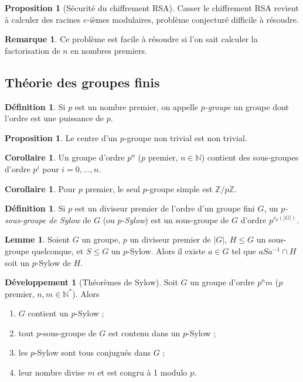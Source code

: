 \documentclass[a5paper, 10pt]{article}
\theoremstyle{definition}
\newtheorem{definition}[equation]{Définition}
\newtheorem{proposition}[equation]{Proposition}
\newtheorem{lemma}[equation]{Lemme}
\newtheorem{remark}[equation]{Remarque}
\newtheorem{corollary}[equation]{Corollaire}
\newcounter{n}
\newtheorem{dev}[n]{Développement}
\def\Z{\mathbb{Z}}
\def\N{\mathbb{N}}
\begin{document}
\begin{proposition}[Sécurité du chiffrement RSA]
  Casser le chiffrement RSA revient à calculer des racines $e$-ièmes
  modulaires, problème conjecturé difficile à résoudre.
\end{proposition}
\begin{remark}
  Ce problème est facile à résoudre si l'on sait calculer la
  factorisation de $n$ en nombres premiers.
\end{remark}

\subsection{Théorie des groupes finis}

\begin{definition}
  Si $p$ est un nombre premier, on appelle \emph{$p$-groupe} un groupe
  dont l'ordre est une puissance de $p$.
\end{definition}
\begin{proposition}
  Le centre d'un $p$-groupe non trivial est non trivial.
\end{proposition}
\begin{corollary}
  Un groupe d'ordre $p^n$ ($p$ premier, $n \in \N$) contient des
  sous-groupes d'ordre $p^i$ pour $i = 0, \ldots, n$.
\end{corollary}
\begin{corollary}
  Pour $p$ premier, le seul $p$-groupe simple est $\Z/p\Z$.
\end{corollary}

\begin{definition}
  Si $p$ est un diviseur premier de l'ordre d'un groupe fini $G$, un
  \emph{$p$-sous-groupe de Sylow} de $G$ (ou \emph{$p$-Sylow}) est un
  sous-groupe de $G$ d'ordre $p^{v_p(|G|)}$.
\end{definition}
\begin{lemma}
  Soient $G$ un groupe, $p$ un diviseur premier de $|G|$, $H \leq G$
  un sous-groupe quelconque, et $S \leq G$ un $p$-Sylow. Alors il
  existe $a \in G$ tel que $aSa^{-1} \cap H$ soit un $p$-Sylow de $H$.
\end{lemma}
\begin{dev}[Théorèmes de Sylow]
  Soit $G$ un groupe d'ordre $p^n m$ ($p$ premier, $n, m \in
  \N^*$). Alors
  \begin{enumerate}
  \item $G$ contient un $p$-Sylow ;
  \item tout $p$-sous-groupe de $G$ est contenu dans un $p$-Sylow ;
  \item les $p$-Sylow sont tous conjugués dans $G$ ;
  \item leur nombre divise $m$ et est congru à 1 modulo $p$.
  \end{enumerate}
\end{dev}
\end{document}
